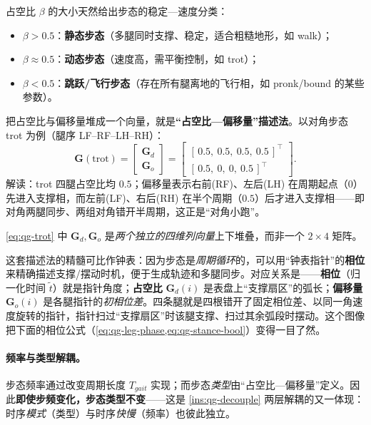占空比 $\beta$ 的大小天然给出步态的稳定—速度分类\cite{unitree2023quadruped}：
\begin{itemize}
  \item $\beta>0.5$：\textbf{静态步态}（多腿同时支撑、稳定，适合粗糙地形，如 walk）；
  \item $\beta\approx0.5$：\textbf{动态步态}（速度高，需平衡控制，如 trot）；
  \item $\beta<0.5$：\textbf{跳跃/飞行步态}（存在所有腿离地的飞行相，如 pronk/bound 的某些参数）。
\end{itemize}

把占空比与偏移量堆成一个向量，就是\textbf{“占空比—偏移量”描述法}。以对角步态 trot 为例（腿序 LF–RF–LH–RH）\cite{yu2021quadruped}：
\begin{equation}
  \mathbf{G}(\mathrm{trot})=\begin{bmatrix}\mathbf{G}_d\\ \mathbf{G}_o\end{bmatrix}
  =\begin{bmatrix}
  [\,0.5,\ 0.5,\ 0.5,\ 0.5\,]^\top\\[2pt]
  [\,0.5,\ 0,\ 0,\ 0.5\,]^\top
  \end{bmatrix}.
  \label{eq:qg-trot}
\end{equation}
解读：trot 四腿占空比均 $0.5$；偏移量表示右前(RF)、左后(LH) 在周期起点（$0$）先进入支撑相，而左前(LF)、右后(RH) 在半个周期（$0.5$）后才进入支撑相——即对角两腿同步、两组对角错开半周期，这正是“对角小跑”。

\cref{eq:qg-trot} 中 $\mathbf{G}_d,\mathbf{G}_o$ 是\emph{两个独立的四维列向量}上下堆叠，而非一个 $2\times4$ 矩阵。

\begin{insight}[相位 = 钟表指针]\label{ins:qg-clock}
这套描述法的精髓可比作钟表：因为步态是\emph{周期循环}的，可以用“钟表指针”的\textbf{相位}来精确描述支撑/摆动时机，便于生成轨迹和多腿同步\cite{unitree2023quadruped}。对应关系是——\textbf{相位}（归一化时间 $\tilde t$）就是指针角度；\textbf{占空比} $\mathbf{G}_d(i)$ 是表盘上“支撑扇区”的弧长；\textbf{偏移量} $\mathbf{G}_o(i)$ 是各腿指针的\emph{初相位差}。四条腿就是四根错开了固定相位差、以同一角速度旋转的指针，指针扫过“支撑扇区”时该腿支撑、扫过其余弧段时摆动。这个图像把下面的相位公式（\cref{eq:qg-leg-phase,eq:qg-stance-bool}）变得一目了然。
\end{insight}

\paragraph{频率与类型解耦。}
步态频率通过改变周期长度 $T_{gait}$ 实现；而步态\emph{类型}由“占空比—偏移量”定义。因此\textbf{即使步频变化，步态类型不变}\cite{yu2021quadruped}——这是 \cref{ins:qg-decouple} 两层解耦的又一体现：时序\emph{模式}（类型）与时序\emph{快慢}（频率）也彼此独立。

